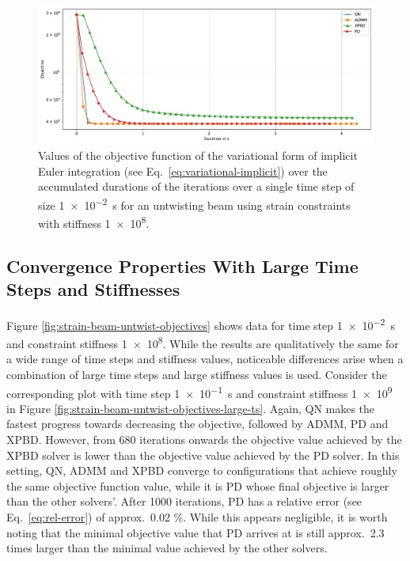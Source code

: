 \begin{figure}[h]
    \includegraphics[width=\textwidth]{figures/strain_beam_untwist_objectives_time.pdf}
    \caption{Values of the objective function of the variational form of implicit Euler integration (see Eq.\ \ref{eq:variational-implicit}) over the accumulated durations of 
        the iterations over a single time step of size \SI{1e-2}{\second} for an untwisting beam using strain constraints with stiffness \num{1e8}.}
    \label{fig:strain-beam-untwist-objectives-time}
\end{figure}

\subsection{Convergence Properties With Large Time Steps and Stiffnesses}\label{ss:untwisting-beam-strain-convergence-large-ts}
Figure \ref{fig:strain-beam-untwist-objectives} shows data for time step \SI{1e-2}{\second} and constraint stiffness \num{1e8}. While the results are qualitatively 
the same for a wide range of time steps and stiffness values, noticeable differences arise when a combination of large time steps and large stiffness values is used.
Consider the corresponding plot with time step \SI{1e-1}{\second} and constraint stiffness \num{1e9} in Figure \ref{fig:strain-beam-untwist-objectives-large-ts}. Again,
QN makes the fastest progress towards decreasing the objective, followed by ADMM, PD and XPBD. However, from 680 iterations onwards the objective value achieved by the XPBD 
solver is lower than the objective value achieved by the PD solver. In this setting, QN, ADMM and XPBD converge to configurations that achieve roughly the same objective 
function value, while it is PD whose final objective is larger than the other solvers'. After 1000 iterations, PD has a relative error (see Eq.\ \ref{eq:rel-error}) 
of approx.\ 0.02 \%. While this appears negligible, it is worth noting that the minimal objective value that PD arrives at is still approx.\ 2.3 
times larger than the minimal value achieved by the other solvers.

